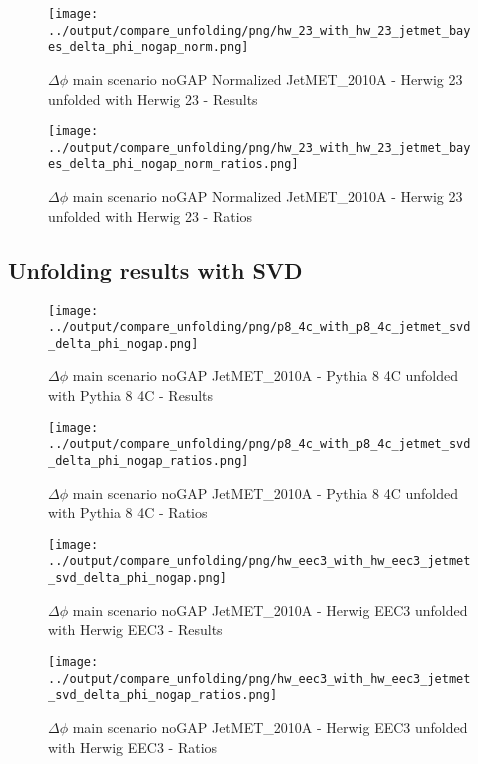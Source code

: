\documentclass[11pt]{book}
\begin{document}
\begin{figure}[ht]
\centering
\texttt{[image: ../output/compare\_unfolding/png/hw\_23\_with\_hw\_23\_jetmet\_bayes\_delta\_phi\_nogap\_norm.png]}
\caption{$\Delta\phi$ main scenario noGAP Normalized JetMET\_2010A - Herwig 23 unfolded with Herwig 23 - Results}
\label{hw_23_hw_23_jetmet_bayes_delta_phi_nogap_norm_a}
\end{figure}

\begin{figure}[ht]
\centering
\texttt{[image: ../output/compare\_unfolding/png/hw\_23\_with\_hw\_23\_jetmet\_bayes\_delta\_phi\_nogap\_norm\_ratios.png]}
\caption{$\Delta\phi$ main scenario noGAP Normalized JetMET\_2010A - Herwig 23 unfolded with Herwig 23 - Ratios}
\label{hw_23_hw_23_jetmet_bayes_delta_phi_nogap_norm_b}
\end{figure}



\clearpage
\subsection{Unfolding results with SVD}

\begin{figure}[ht]
\centering
\texttt{[image: ../output/compare\_unfolding/png/p8\_4c\_with\_p8\_4c\_jetmet\_svd\_delta\_phi\_nogap.png]}
\caption{$\Delta\phi$ main scenario noGAP JetMET\_2010A - Pythia 8 4C unfolded with Pythia 8 4C - Results}
\label{p8_p8_jetmet_svd_delta_phi_nogap_a}
\end{figure}

\begin{figure}[ht]
\centering
\texttt{[image: ../output/compare\_unfolding/png/p8\_4c\_with\_p8\_4c\_jetmet\_svd\_delta\_phi\_nogap\_ratios.png]}
\caption{$\Delta\phi$ main scenario noGAP JetMET\_2010A - Pythia 8 4C unfolded with Pythia 8 4C - Ratios}
\label{p8_p8_jetmet_svd_delta_phi_nogap_b}
\end{figure}

\begin{figure}[ht]
\centering
\texttt{[image: ../output/compare\_unfolding/png/hw\_eec3\_with\_hw\_eec3\_jetmet\_svd\_delta\_phi\_nogap.png]}
\caption{$\Delta\phi$ main scenario noGAP JetMET\_2010A - Herwig EEC3 unfolded with Herwig EEC3 - Results}
\label{hw_eec3_hw_eec3_jetmet_svd_delta_phi_nogap_a}
\end{figure}

\begin{figure}[ht]
\centering
\texttt{[image: ../output/compare\_unfolding/png/hw\_eec3\_with\_hw\_eec3\_jetmet\_svd\_delta\_phi\_nogap\_ratios.png]}
\caption{$\Delta\phi$ main scenario noGAP JetMET\_2010A - Herwig EEC3 unfolded with Herwig EEC3 - Ratios}
\label{hw_eec3_hw_eec3_jetmet_svd_delta_phi_nogap_b}
\end{figure}
\end{document}
